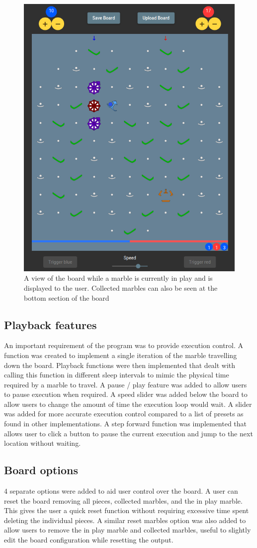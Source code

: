 \documentclass{l4proj}
\begin{document}
\begin{figure}
    \centering
    \includegraphics[width=0.5\linewidth]{images/marbleInPlay.png}
    \caption{A view of the board while a marble is currently in play and is displayed to the user. Collected marbles can also be seen at the bottom section of the board}
    \label{fig:marbleInPlay}
\end{figure}

\subsection{Playback features}
An important requirement of the program was to provide execution control. A function was created to implement a single iteration of the marble travelling down the board. Playback functions were then implemented that dealt with calling this function in different sleep intervals to mimic the physical time required by a marble to travel. A pause / play feature was added to allow users to pause execution when required. A speed slider was added below the board to allow users to change the amount of time the execution loop would wait. A slider was added for more accurate execution control compared to a list of presets as found in other implementations. A step forward function was implemented that allows user to click a button to pause the current execution and jump to the next location without waiting. 

\subsection{Board options}
4 separate options were added to aid user control over the board. A user can reset the board removing all pieces, collected marbles, and the in play marble. This gives the user a quick reset function without requiring excessive time spent deleting the individual pieces. A similar reset marbles option was also added to allow users to remove the in play marble and collected marbles, useful to slightly edit the board configuration while resetting the output.
\end{document}
